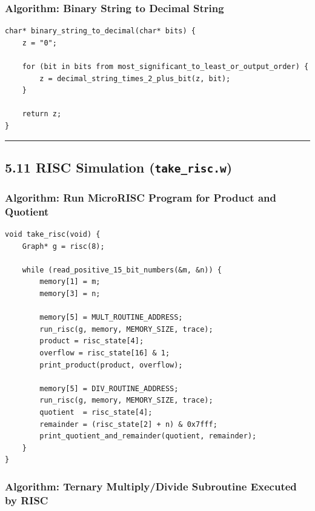 \documentclass[11pt]{article}
\begin{document}
\subsubsection{Algorithm: Binary String to Decimal String}\label{algorithm-binary-string-to-decimal-string}

\begin{verbatim}
char* binary_string_to_decimal(char* bits) {
    z = "0";

    for (bit in bits from most_significant_to_least_or_output_order) {
        z = decimal_string_times_2_plus_bit(z, bit);
    }

    return z;
}
\end{verbatim}

\begin{center}\rule{0.5\linewidth}{0.5pt}\end{center}

\subsection{\texorpdfstring{5.11 RISC Simulation (\texttt{take\_risc.w})}{5.11 RISC Simulation (take\_risc.w)}}\label{risc-simulation-take_risc.w}

\subsubsection{Algorithm: Run MicroRISC Program for Product and Quotient}\label{algorithm-run-microrisc-program-for-product-and-quotient}

\begin{verbatim}
void take_risc(void) {
    Graph* g = risc(8);

    while (read_positive_15_bit_numbers(&m, &n)) {
        memory[1] = m;
        memory[3] = n;

        memory[5] = MULT_ROUTINE_ADDRESS;
        run_risc(g, memory, MEMORY_SIZE, trace);
        product = risc_state[4];
        overflow = risc_state[16] & 1;
        print_product(product, overflow);

        memory[5] = DIV_ROUTINE_ADDRESS;
        run_risc(g, memory, MEMORY_SIZE, trace);
        quotient  = risc_state[4];
        remainder = (risc_state[2] + n) & 0x7fff;
        print_quotient_and_remainder(quotient, remainder);
    }
}
\end{verbatim}

\subsubsection{Algorithm: Ternary Multiply/Divide Subroutine Executed by RISC}\label{algorithm-ternary-multiplydivide-subroutine-executed-by-risc}
\end{document}
